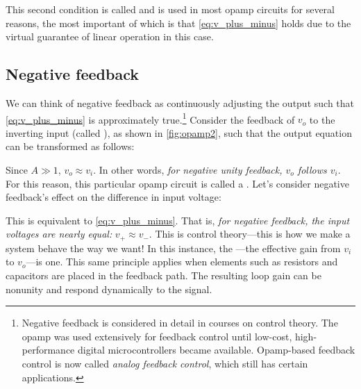 \documentclass[electronics.tex]{subfiles}
\begin{document}
This second condition is called  and is used in most opamp circuits for several reasons, the most important of which is that \autoref{eq:v_plus_minus} holds due to the virtual guarantee of linear operation in this case.
\tags{}

\subsection{Negative feedback}
\tags{}

We can think of negative feedback as continuously adjusting the output such that \autoref{eq:v_plus_minus} is approximately true.\footnote{Negative feedback is considered in detail in courses on control theory. The opamp was used extensively for feedback control until low-cost, high-performance digital microcontrollers became available. Opamp-based feedback control is now called \emph{analog feedback control}, which still has certain applications.}
Consider the feedback of $v_o$ to the inverting input (called ), as shown in \autoref{fig:opamp2}, such that the output equation can be transformed as follows:
\tags{}

Since $A \gg 1$, $v_o \approx v_i$.
In other words, \emph{for negative unity feedback, $v_o$ follows $v_i$}.
For this reason, this particular opamp circuit is called a .
Let's consider negative feedback's effect on the difference in input voltage:


This is equivalent to \autoref{eq:v_plus_minus}.
That is, \emph{for negative feedback, the input voltages are nearly equal:} $v_+ \approx v_-$.
This is control theory---this is how we make a system behave the way we want!
In this instance, the ---the effective gain from $v_i$ to $v_o$---is one.
This same principle applies when elements such as resistors and capacitors are placed in the feedback path.
The resulting loop gain can be nonunity and respond dynamically to the signal.
\end{document}
